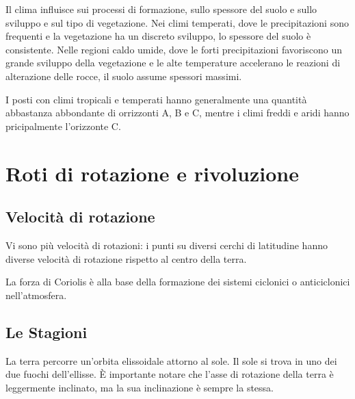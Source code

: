 \documentclass[a4paper]{article}
\begin{document}
Il clima influisce sui processi di formazione, sullo spessore del suolo e sullo sviluppo e sul tipo di vegetazione.
Nei climi temperati, dove le precipitazioni sono frequenti e la vegetazione ha un discreto sviluppo,
lo spessore del suolo è consistente.
Nelle regioni caldo umide, dove le forti precipitazioni favoriscono un grande sviluppo della vegetazione
e le alte temperature accelerano le reazioni di alterazione delle rocce, il suolo assume spessori massimi.

I posti con climi tropicali e temperati hanno generalmente una quantità
abbastanza abbondante di orrizzonti A, B e C, mentre i climi freddi e aridi hanno pricipalmente
l'orizzonte C.

\pagebreak

\section{Roti di rotazione e rivoluzione}

\subsection{Velocità di rotazione}

Vi sono più velocità di rotazioni: i punti su diversi cerchi di latitudine hanno diverse velocità di rotazione rispetto al centro della terra.


La forza di Coriolis è alla base della formazione dei sistemi ciclonici o anticiclonici nell'atmosfera.

\subsection{Le Stagioni}

La terra percorre un'orbita elissoidale attorno al sole. Il sole si trova in uno dei due fuochi dell'ellisse.
È importante notare che l'asse di rotazione della terra è leggermente inclinato, ma la sua
inclinazione è sempre la stessa.

\end{document}
